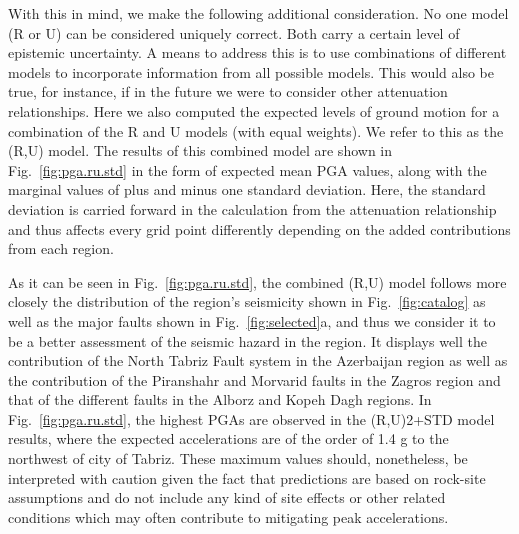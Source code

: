 With this in mind, we make the following additional consideration. No one model (R or U) can be considered uniquely correct. Both carry a certain level of epistemic uncertainty. A means to address this is to use combinations of different models to incorporate information from all possible models. This would also be true, for instance, if in the future we were to consider other attenuation relationships. Here we also computed the expected levels of ground motion for a combination of the R and U models (with equal weights). We refer to this as the (R,U) model. The results of this combined model are shown in Fig.~\ref{fig:pga.ru.std} in the form of expected mean PGA values, along with the marginal values of plus and minus one standard deviation. Here, the standard deviation is carried forward in the calculation from the attenuation relationship and thus affects every grid point differently depending on the added contributions from each region. 

As it can be seen in Fig.~\ref{fig:pga.ru.std}, the combined (R,U) model follows more closely the distribution of the region's seismicity shown in Fig.~\ref{fig:catalog} as well as the major faults shown in Fig.~\ref{fig:selected}a, and thus we consider it to be a better assessment of the seismic hazard in the region. It displays well the contribution of the North Tabriz Fault system in the Azerbaijan region as well as the contribution of the Piranshahr and Morvarid faults in the Zagros region and that of the different faults in the Alborz and Kopeh Dagh regions. In Fig.~\ref{fig:pga.ru.std}, the highest PGAs are observed in the (R,U)2+STD model results, where the expected accelerations are of the order of 1.4 g to the northwest of  city of Tabriz. These maximum values should, nonetheless, be interpreted with caution given the fact that predictions are based on rock-site assumptions and do not include any kind of site effects or other related conditions which may often contribute to mitigating peak accelerations.

